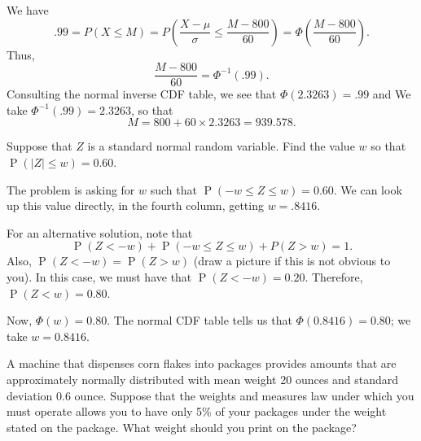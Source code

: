 \documentclass[11pt]{exam}
\DeclareMathOperator*{\Prob}{P}
\renewcommand{\Pr}{\Prob}
\begin{document}
\begin{questions}
\begin{solution}
We have
\[
  .99 = P(X \leq M) = P\left(\frac{X - \mu}{\sigma} \leq \frac{M - 800}{60}\right) =
  \Phi\left(\frac{M - 800}{60}\right).
\]
Thus,
\[
  \frac{M - 800}{60} = \Phi^{-1}(.99).
\]
Consulting the normal inverse CDF table, we see that $\Phi(2.3263) = .99$ and
We take $\Phi^{-1}(.99) = 2.3263$, so that
\[
  M = 800 + 60 \times 2.3263 = 939.578.
\]
\end{solution}

\newpage

\question Suppose that $Z$ is a standard normal random variable.  %
Find the value $w$ so that $\Pr(|Z| \leq w) = 0.60$.

\begin{solution}
The problem is asking for $w$ such that $\Pr(-w \leq Z \leq w) = 0.60$.  We
can look up this value directly, in the fourth column, getting
$w = .8416$.

For an alternative solution, note that
\[
  \Pr(Z < -w) + \Pr(-w \leq Z \leq w) + P(Z > w) = 1.
\]
Also, $\Pr(Z < -w) = \Pr(Z > w)$ (draw a picture if this is not obvious to you).
In this case, we must have that $\Pr(Z < -w) = 0.20$.  Therefore, $\Pr(Z < w) =
0.80$.

Now, $\Phi(w) = 0.80$.  The normal CDF table tells us that $\Phi(0.8416) =
0.80$; we take $w = 0.8416$.
\end{solution}


%
%
%


\question A machine that dispenses corn flakes into packages provides amounts that are
approximately normally distributed with mean weight 20 ounces and standard
deviation 0.6 ounce.  Suppose that the weights and measures law under which
you must operate allows you to have only 5\% of your packages under the weight
stated on the package.  What weight should you print on the package?


\end{questions}
\end{document}
